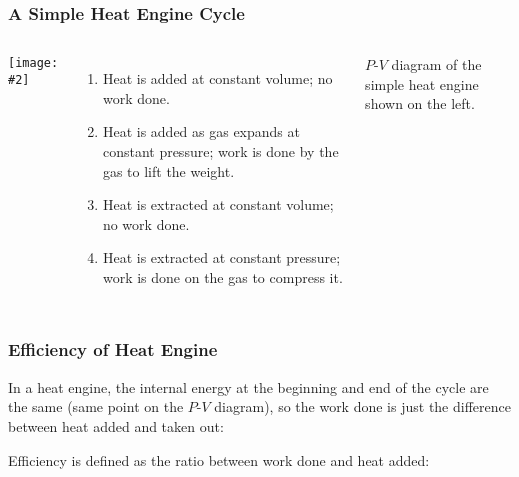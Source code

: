 \documentclass[12pt,aspectratio=169]{beamer}
\newcommand{\pic}[2]{\texttt{[image: \#2]}}
\newcommand{\eq}[2]{\vspace{#1}{\Large\begin{displaymath}#2\end{displaymath}}}
\begin{document}
\begin{frame}
  \frametitle{A Simple Heat Engine Cycle}
  \begin{columns}
    \begin{center}
      \pic{.5}{heat-engine.jpg}
    \end{center}
    \begin{enumerate}
    \item\vspace{-.15in} Heat is added at constant volume; no work done.
    \item Heat is added as gas expands at constant pressure; work is done by
      the gas to lift the weight.
    \item Heat is extracted at constant volume; no work done.
    \item Heat is extracted at constant pressure; work is done on the gas to
      compress it.
    \end{enumerate}

    {\footnotesize $P$-$V$ diagram of the simple heat engine shown on the left.
      \par}
  \end{columns}
\end{frame}


\begin{frame}
  \frametitle{Efficiency of Heat Engine}
  In a heat engine, the internal energy at the beginning and end of the cycle
  are the same (same point on the $P$-$V$ diagram), so the work done is just
  the difference between heat added and taken out:
  
  \eq{-.25in}{
    W = Q_\mathrm{in}-Q_\mathrm{out}
  }
  
  \vspace{-.15in}Efficiency is defined as the ratio between work done and heat
  added:

  \eq{-.25in}{
    \boxed{\eta =\frac{W}{Q_\mathrm{in}}=1-\frac{Q_\mathrm{out}}{Q_\mathrm{in}}}
  }

\end{frame}
\end{document}

